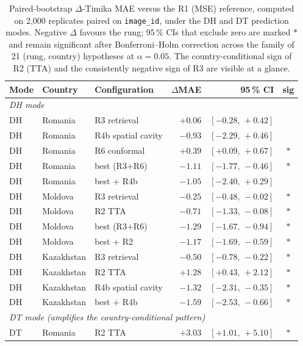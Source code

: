 \begin{table}[!htb]
\centering
\caption{Paired-bootstrap $\Delta$-Timika MAE versus the R1 (MSE) reference, computed on 2{,}000 replicates paired on \texttt{image\_id}, under the DH and DT prediction modes. Negative $\Delta$ favours the rung; 95\,\% CIs that exclude zero are marked $\ast$ and remain significant after Bonferroni--Holm correction across the family of 21 (rung, country) hypotheses at $\alpha=0.05$. The country-conditional sign of R2 (TTA) and the consistently negative sign of R3 are visible at a glance.}
\label{tab:bootstrap}
\small
\setlength{\tabcolsep}{5pt}
\begin{tabular}{l l l r r c}
\toprule
Mode & Country & Configuration & $\Delta$MAE & 95\,\% CI & sig \\
\midrule
\multicolumn{6}{l}{\textit{DH mode}} \\
DH & Romania    & R3 retrieval         & $+0.06$ & $[-0.28,\,+0.42]$ &  \\
DH & Romania    & R4b spatial cavity    & $-0.93$ & $[-2.29,\,+0.46]$ &  \\
DH & Romania    & R6 conformal          & $+0.39$ & $[+0.09,\,+0.67]$ & $\ast$ \\
DH & Romania    & best (R3$+$R6)        & $-1.11$ & $[-1.77,\,-0.46]$ & $\ast$ \\
DH & Romania    & best $+$ R4b          & $-1.05$ & $[-2.40,\,+0.29]$ &  \\
DH & Moldova    & R3 retrieval          & $-0.25$ & $[-0.48,\,-0.02]$ & $\ast$ \\
DH & Moldova    & R2 TTA                & $-0.71$ & $[-1.33,\,-0.08]$ & $\ast$ \\
DH & Moldova    & best (R3$+$R6)        & $-1.29$ & $[-1.67,\,-0.94]$ & $\ast$ \\
DH & Moldova    & best $+$ R2           & $-1.17$ & $[-1.69,\,-0.59]$ & $\ast$ \\
DH & Kazakhstan & R3 retrieval          & $-0.50$ & $[-0.78,\,-0.22]$ & $\ast$ \\
DH & Kazakhstan & R2 TTA                & $+1.28$ & $[+0.43,\,+2.12]$ & $\ast$ \\
DH & Kazakhstan & R4b spatial cavity    & $-1.32$ & $[-2.31,\,-0.35]$ & $\ast$ \\
DH & Kazakhstan & best $+$ R4b          & $-1.59$ & $[-2.53,\,-0.66]$ & $\ast$ \\
\midrule
\multicolumn{6}{l}{\textit{DT mode (amplifies the country-conditional pattern)}} \\
DT & Romania    & R2 TTA                & $+3.03$ & $[+1.01,\,+5.10]$ & $\ast$ \\

\end{tabular}
\end{table}
